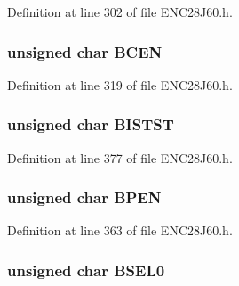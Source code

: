 Definition at line 302 of file E\+N\+C28\+J60.\+h.

\hypertarget{union___r_e_g_ad1d1075544e2001d31838b326c3a8b75}{}
\subsubsection[{B\+C\+E\+N}]{\setlength{\rightskip}{0pt plus 5cm}unsigned {\bf char} B\+C\+E\+N}\label{union___r_e_g_ad1d1075544e2001d31838b326c3a8b75}


Definition at line 319 of file E\+N\+C28\+J60.\+h.

\hypertarget{union___r_e_g_a775b340b73ea82e7b109e7a029571343}{}
\subsubsection[{B\+I\+S\+T\+S\+T}]{\setlength{\rightskip}{0pt plus 5cm}unsigned {\bf char} B\+I\+S\+T\+S\+T}\label{union___r_e_g_a775b340b73ea82e7b109e7a029571343}


Definition at line 377 of file E\+N\+C28\+J60.\+h.

\hypertarget{union___r_e_g_a860c126bf67494d3a3f1e67e0800867b}{}
\subsubsection[{B\+P\+E\+N}]{\setlength{\rightskip}{0pt plus 5cm}unsigned {\bf char} B\+P\+E\+N}\label{union___r_e_g_a860c126bf67494d3a3f1e67e0800867b}


Definition at line 363 of file E\+N\+C28\+J60.\+h.

\hypertarget{union___r_e_g_a8a7946d76b29f36372baa0cbd797f04e}{}
\subsubsection[{B\+S\+E\+L0}]{\setlength{\rightskip}{0pt plus 5cm}unsigned {\bf char} B\+S\+E\+L0}\label{union___r_e_g_a8a7946d76b29f36372baa0cbd797f04e}


